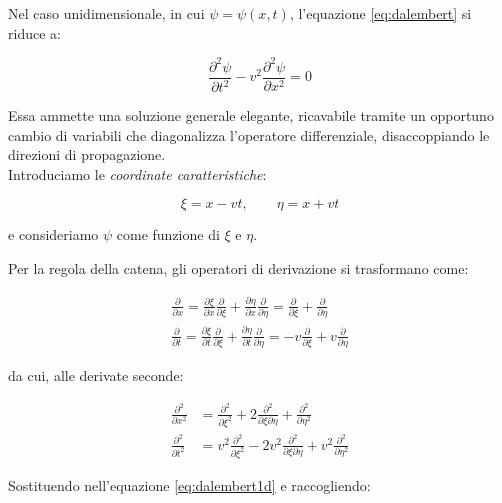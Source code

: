 Nel caso unidimensionale, in cui $\psi = \psi(x, t)$, l'equazione \ref{eq:dalembert} si riduce a:

\begin{equation}
    \frac{\partial^2 \psi}{\partial t^2} - v^2 
    \frac{\partial^2 \psi}{\partial x^2} = 0
    \label{eq:dalembert1d}
\end{equation}

Essa ammette una soluzione generale elegante, ricavabile tramite un opportuno cambio di variabili che diagonalizza l'operatore differenziale, disaccoppiando le direzioni di propagazione.\\

Introduciamo le \textit{coordinate caratteristiche}:

\begin{equation}
    \xi = x - vt, \qquad \eta = x + vt
\end{equation}

e consideriamo $\psi$ come funzione di $\xi$ e $\eta$.  

\newpage

Per la regola della catena, gli operatori di derivazione si trasformano come:

\begin{align}
    \frac{\partial}{\partial x} = \frac{\partial \xi}{\partial x} \frac{\partial}{\partial \xi} + \frac{\partial \eta}{\partial x} \frac{\partial}{\partial \eta} = \frac{\partial}{\partial \xi} + \frac{\partial}{\partial \eta} \\
    \frac{\partial}{\partial t} = \frac{\partial \xi}{\partial t} \frac{\partial}{\partial \xi} + \frac{\partial \eta}{\partial t} \frac{\partial}{\partial \eta} = - v \frac{\partial}{\partial \xi} + v \frac{\partial}{\partial \eta}
\end{align}

da cui, alle derivate seconde:

\begin{align}
    \frac{\partial^2}{\partial x^2} &= \frac{\partial^2}{\partial \xi^2} 
    + 2\frac{\partial^2}{\partial \xi \partial \eta} 
    + \frac{\partial^2}{\partial \eta^2} \\[6pt]
    \frac{\partial^2}{\partial t^2} &= v^2\frac{\partial^2}{\partial \xi^2} 
    - 2v^2\frac{\partial^2}{\partial \xi \partial \eta} 
    + v^2\frac{\partial^2}{\partial \eta^2}
\end{align}

Sostituendo nell'equazione \ref{eq:dalembert1d} e raccogliendo:

